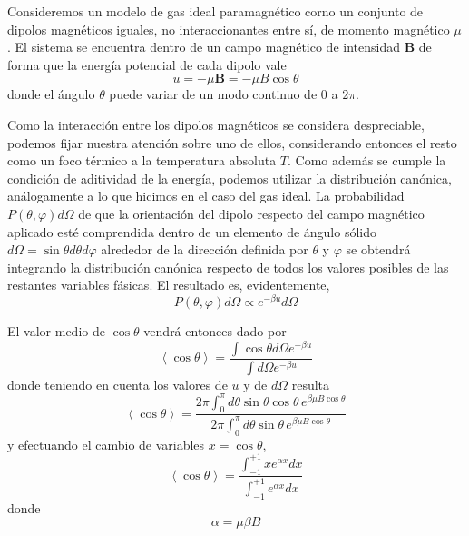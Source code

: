 Consideremos un modelo de gas ideal paramagnético corno un conjunto de dipolos magnéticos iguales, no interaccionantes entre sí, de momento magnético $\mu$.
El sistema se encuentra dentro de un campo magnético de intensidad $\mathbf{B}$ de forma que la energía potencial de cada dipolo vale
\begin{equation}\label{eq:u_def}
	u = -\mu \mathbf{B} = -\mu B \cos\theta
\end{equation}
donde el ángulo $\theta$ puede variar de un modo continuo de 0 a $2\pi$.

Como la interacción entre los dipolos magnéticos se considera despreciable, podemos fijar nuestra atención sobre uno de ellos, considerando entonces el resto como un foco térmico a la temperatura absoluta $T$.
Como además se cumple la condición de aditividad de la energía, podemos utilizar la distribución canónica, análogamente a lo que hicimos en el caso del gas ideal.
La probabilidad $P(\theta, \varphi) d\Omega$ de que la orientación del dipolo respecto del campo magnético aplicado esté comprendida dentro de un elemento de ángulo sólido $d\Omega = \sin \theta d\theta d\varphi$ alrededor de la dirección definida por $\theta$ y $\varphi$ se obtendrá integrando la distribución canónica respecto de todos los valores posibles de las restantes variables fásicas. 
El resultado es, evidentemente,
\begin{equation}
	P(\theta, \varphi) d\Omega \propto e^{-\beta u} d\Omega
\end{equation}

El valor medio de $\cos \theta$ vendrá entonces dado por
\begin{equation}
	\left\langle \cos \theta \right\rangle = \frac{\int \cos \theta d\Omega e^{-\beta u}}{\int d\Omega e^{-\beta u}}
\end{equation}
donde teniendo en cuenta los valores de $u$ y de $d\Omega$ resulta
\begin{equation}
	\left\langle \cos \theta \right\rangle = \frac{2\pi \int_0^{\pi} d\theta \sin \theta \cos \theta \, e^{\beta \mu B \cos\theta}}{2\pi \int_0^{\pi} d\theta \sin \theta \, e^{\beta \mu B \cos\theta}}
\end{equation}
y efectuando el cambio de variables $x = \cos \theta$,
\begin{equation}\label{eq:cos_med}
	\left\langle \cos \theta \right\rangle = \frac{\int_{-1}^{+1} x e^{\alpha x} dx}{\int_{-1}^{+1} e^{\alpha x} dx}
\end{equation}
donde
$$\alpha = \mu\beta B$$


